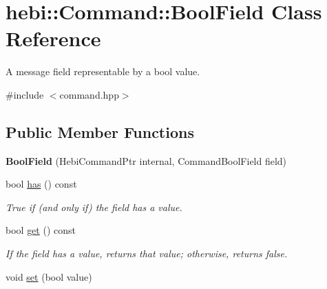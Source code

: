 \hypertarget{classhebi_1_1Command_1_1BoolField}{}\section{hebi\+:\+:Command\+:\+:Bool\+Field Class Reference}
\label{classhebi_1_1Command_1_1BoolField}


A message field representable by a bool value.  




{\ttfamily \#include $<$command.\+hpp$>$}

\subsection*{Public Member Functions}
\begin{DoxyCompactItemize}
\item 
\mbox{\label{classhebi_1_1Command_1_1BoolField_aa7c37e884beea83cbfeddad70722a5af}} 
{\bfseries Bool\+Field} (Hebi\+Command\+Ptr internal, Command\+Bool\+Field field)
\item 
\mbox{\label{classhebi_1_1Command_1_1BoolField_a02887731cf6b14ef89f8a4f6b8f210c8}} 
bool \hyperlink{classhebi_1_1Command_1_1BoolField_a02887731cf6b14ef89f8a4f6b8f210c8}{has} () const
\begin{DoxyCompactList}\small\item\em True if (and only if) the field has a value. \end{DoxyCompactList}\item 
\mbox{\label{classhebi_1_1Command_1_1BoolField_ab4cc684534aa154da4829c4188785433}} 
bool \hyperlink{classhebi_1_1Command_1_1BoolField_ab4cc684534aa154da4829c4188785433}{get} () const
\begin{DoxyCompactList}\small\item\em If the field has a value, returns that value; otherwise, returns false. \end{DoxyCompactList}\item 
\mbox{\label{classhebi_1_1Command_1_1BoolField_af5c94cf5ce17aaf9b159df3a2c83f2f6}} 
void \hyperlink{classhebi_1_1Command_1_1BoolField_af5c94cf5ce17aaf9b159df3a2c83f2f6}{set} (bool value)

\end{DoxyCompactItemize}
